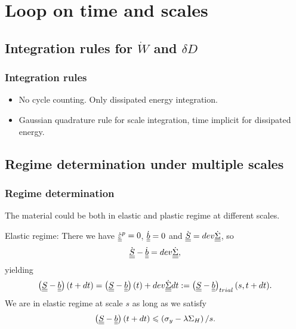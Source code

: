 \documentclass[xcolor=table]{Bredelebeamer}
\begin{document}
\section{Loop on time and scales}
\subsection{Integration rules for $\dot{W}$ and $\delta D$}

\begin{frame}
\frametitle{Integration rules}
	\begin{block}{}	
\begin{itemize}
\item No cycle counting. Only dissipated energy integration.
					
\vspace{6pt}
\item Gaussian quadrature rule for scale integration, time implicit for dissipated energy.

\end{itemize}	
\end{block}
\end{frame}	

\subsection{Regime determination under multiple scales}
\begin{frame}
	\frametitle{Regime determination}
	The material could be both in elastic and plastic regime at different scales.
	\begin{block}{Elastic regime:}	
\noindent
There we have
$\dot{\uline{\uline{\varepsilon}}}^p=0$, $\dot{\uline{\uline{b}}}=0$ and $\dot{\uline{\uline{S}}}=dev\dot{\uline{\uline{\Sigma}}}$, so
$$\dot{\uline{\uline{S}}}-\dot{\uline{\uline{b}}}=dev\dot{\uline{\uline{\Sigma}}},$$ 
yielding
\begin{equation}
\left( \uline{\uline{S}}-\uline{\uline{b}}\right) (t+dt)=\left( \uline{\uline{S}}-\uline{\uline{b}}\right) (t)+dev\dot{\uline{\uline{\Sigma}}}dt:=\left(  \uline{\uline{S}}-\uline{\uline{b}}\right)_{trial}(s,t+dt).
\label{trial}
\end{equation}
We are in elastic regime at scale $s$ as long as we satisfy
$$\left( \uline{\uline{S}}-\uline{\uline{b}}\right) (t+dt)\leqslant\left( \sigma_y-\lambda \Sigma_H\right)/s.$$	
	\end{block}
\end{frame}	
\end{document}
